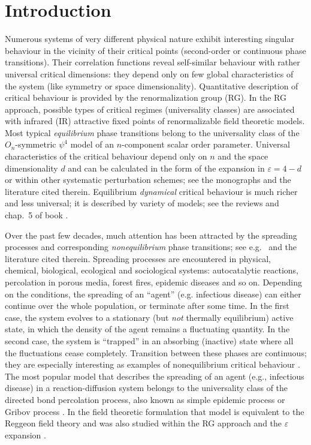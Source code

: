 \documentclass[12pt]{article}
\begin{document}

\maketitle

\section{Introduction} \label{sec:Intro}

Numerous systems of very different physical nature exhibit interesting
singular behaviour in the vicinity of their critical points
(second-order or continuous phase transitions). Their correlation functions
reveal self-similar behaviour with rather universal
critical dimensions: they depend only on few global characteristics of
the system (like symmetry or space dimensionality).
Quantitative description of critical behaviour is provided by the
renormalization group (RG). In the RG approach, possible types of critical
regimes (universality classes) are associated with infrared (IR) attractive
fixed points of renormalizable field theoretic models. Most typical
{\it equilibrium} phase
transitions belong to the universality class of the $O_{n}$-symmetric
$\psi^{4}$ model of an $n$-component scalar order parameter.
Universal characteristics of the critical behaviour depend only on $n$ and
the space dimensionality $d$ and can be calculated in the form of the
expansion in $\varepsilon=4-d$ or within other systematic perturbation
schemes; see the monographs \cite{Zinn,Book3} and the literature cited
therein. Equilibrium {\it dynamical} critical behaviour is much richer
and less universal; it is described by variety of models; see the
reviews \cite{HH} and chap.~5 of book \cite{Book3}.

Over the past few decades, much attention has been attracted by the
spreading processes and corresponding {\it nonequilibrium} phase
transitions; see e.g.~\cite{Hinr,JT} and the literature cited therein.
Spreading processes are encountered in
physical, chemical, biological, ecological and sociological systems:
autocatalytic reactions, percolation in porous media, forest fires,
epidemic diseases and so on. Depending on the conditions, the spreading
of an ``agent'' (e.g. infectious disease) can either
continue over the whole population, or terminate after some time. In the
first case, the system evolves to a stationary (but {\it not} thermally
equilibrium) active state, in which the density of the agent remains a
fluctuating quantity. In the second case, the system is ``trapped'' in an
absorbing (inactive) state where all the fluctuations cease completely.
Transition between these phases are continuous; they are especially
interesting as examples of nonequilibrium critical behaviour
\cite{Hinr}. The most popular model that describes the spreading
of an agent (e.g., infectious disease) in a reaction-diffusion system
belongs to the universality class of the directed bond percolation
process, also known as simple epidemic process or Gribov process
\cite{Hinr}. In the field theoretic formulation that model is equivalent
to the Reggeon field theory and was also studied within the
RG approach and the $\varepsilon$ expansion  \cite{JT}.
\end{document}
